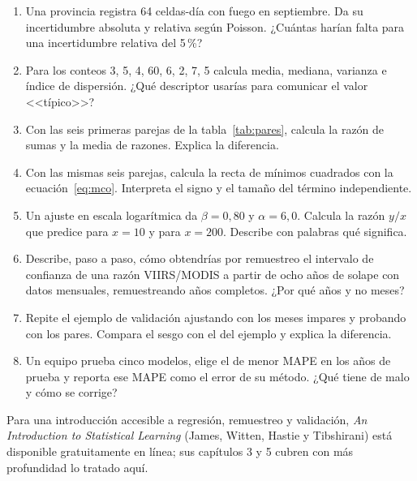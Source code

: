 \begin{enumerate}
  \item Una provincia registra 64 celdas-día con fuego en septiembre. Da su incertidumbre
  absoluta y relativa según Poisson. ¿Cuántas harían falta para una incertidumbre relativa del
  5\,{}\%?
  \item Para los conteos 3, 5, 4, 60, 6, 2, 7, 5 calcula media, mediana, varianza e índice de
  dispersión. ¿Qué descriptor usarías para comunicar el valor <<típico>>?
  \item Con las seis primeras parejas de la tabla~\ref{tab:pares}, calcula la razón de sumas y
  la media de razones. Explica la diferencia.
  \item Con las mismas seis parejas, calcula la recta de mínimos cuadrados con la
  ecuación~\eqref{eq:mco}. Interpreta el signo y el tamaño del término independiente.
  \item Un ajuste en escala logarítmica da $\beta = 0{,}80$ y $\alpha = 6{,}0$. Calcula la
  razón $y/x$ que predice para $x = 10$ y para $x = 200$. Describe con palabras qué significa.
  \item Describe, paso a paso, cómo obtendrías por remuestreo el intervalo de confianza de una
  razón VIIRS/MODIS a partir de ocho años de solape con datos mensuales, remuestreando años
  completos. ¿Por qué años y no meses?
  \item Repite el ejemplo de validación ajustando con los meses impares y probando con los
  pares. Compara el sesgo con el del ejemplo y explica la diferencia.
  \item Un equipo prueba cinco modelos, elige el de menor MAPE en los años de prueba y reporta
  ese MAPE como el error de su método. ¿Qué tiene de malo y cómo se corrige?
\end{enumerate}

\lecturas

Para una introducción accesible a regresión, remuestreo y validación, \emph{An Introduction to
Statistical Learning} (James, Witten, Hastie y Tibshirani) está disponible gratuitamente en
línea; sus capítulos 3 y 5 cubren con más profundidad lo tratado aquí.
